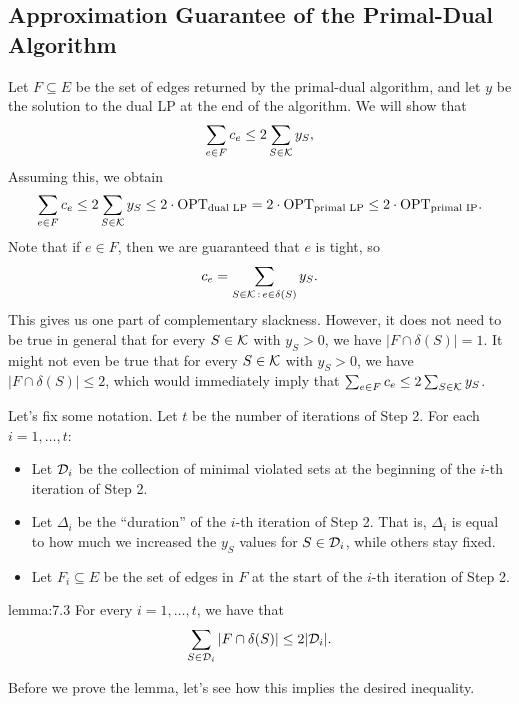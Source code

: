 \subsection{Approximation Guarantee of the Primal-Dual Algorithm} \label{subsec:7.6}
Let $F \subseteq E$ be the set of edges returned by the primal-dual algorithm, 
and let $y$ be the solution to the dual LP at the end of the algorithm. 
We will show that 
\[ \sum_{e \in F} c_e \leq 2 \sum_{S \in {\cal K}} y_S, \] 
Assuming this, we obtain 
\[ \sum_{e \in F} c_e \leq 2 \sum_{S \in {\cal K}} y_S \leq 2 \cdot 
\text{OPT}_{\text{dual LP}} = 2 \cdot \text{OPT}_{\text{primal LP}} 
\leq 2 \cdot \text{OPT}_{\text{primal IP}}. \] 
Note that if $e \in F$, then we are guaranteed that $e$ is tight, so 
\[ c_e = \sum_{S \in {\cal K}\,:\,e \in \delta(S)} y_S. \]
This gives us one part of complementary slackness. However, it does not 
need to be true in general that for every $S \in {\cal K}$ with 
$y_S > 0$, we have $|F \cap \delta(S)| = 1$. It might not even be true that 
for every $S \in {\cal K}$ with $y_S > 0$, we have $|F \cap \delta(S)| \leq 2$,
which would immediately imply that $\sum_{e \in F} c_e \leq 2 \sum_{S \in {\cal K}} y_S$.

Let's fix some notation. Let $t$ be the number of iterations of Step 2. 
For each $i = 1, \dots, t$:
\begin{itemize}
    \item Let ${\cal D}_i$ be the collection of minimal violated sets 
    at the beginning of the $i$-th iteration of Step 2.
    \item Let $\Delta_i$ be the ``duration'' of the $i$-th iteration of 
    Step 2. That is, $\Delta_i$ is equal to how much we increased 
    the $y_S$ values for $S \in {\cal D}_i$, while others stay fixed. 
    \item Let $F_i \subseteq E$ be the set of edges in $F$ at the 
    start of the $i$-th iteration of Step 2.
\end{itemize}

\begin{lemma}{lemma:7.3}
    For every $i = 1, \dots, t$, we have that
    \[ \sum_{S \in {\cal D}_i} |F \cap \delta(S)| \leq 2|{\cal D}_i|. \] 
\end{lemma}\vspace{-0.25cm}

Before we prove the lemma, let's see how this implies the desired inequality. 

